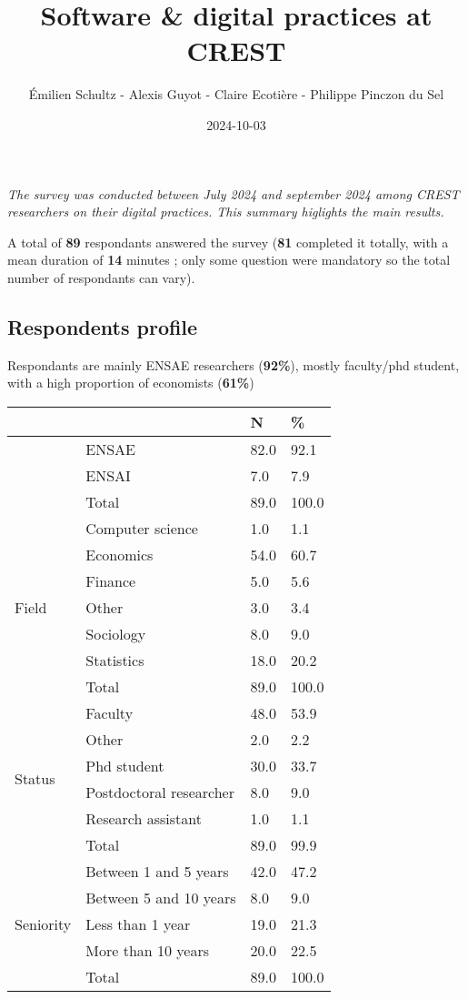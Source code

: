 \documentclass[
  letterpaper,
  DIV=11,
  numbers=noendperiod]{scrartcl}
\title{Software \& digital practices at CREST}
\author{Émilien Schultz - Alexis Guyot - Claire Ecotière - Philippe
Pinczon du Sel}
\date{2024-10-03}
\begin{document}
\maketitle


\emph{The survey was conducted between July 2024 and september 2024
among CREST researchers on their digital practices. This summary
higlights the main results.}

A total of \textbf{89} respondants answered the survey (\textbf{81}
completed it totally, with a mean duration of \textbf{14} minutes ; only
some question were mandatory so the total number of respondants can
vary).

\subsection{Respondents profile}\label{respondents-profile}

Respondants are mainly ENSAE researchers (\textbf{92\%}), mostly
faculty/phd student, with a high proportion of economists
(\textbf{61\%})

\begin{longtable}[]{@{}llll@{}}
\toprule\noalign{}
& & N & \% \\
\midrule\noalign{}
\endhead
\bottomrule\noalign{}
\endlastfoot
\multirow{3}{=}{Organization} & ENSAE & 82.0 & 92.1 \\
& ENSAI & 7.0 & 7.9 \\
& Total & 89.0 & 100.0 \\
\multirow{7}{=}{Field} & Computer science & 1.0 & 1.1 \\
& Economics & 54.0 & 60.7 \\
& Finance & 5.0 & 5.6 \\
& Other & 3.0 & 3.4 \\
& Sociology & 8.0 & 9.0 \\
& Statistics & 18.0 & 20.2 \\
& Total & 89.0 & 100.0 \\
\multirow{6}{=}{Status} & Faculty & 48.0 & 53.9 \\
& Other & 2.0 & 2.2 \\
& Phd student & 30.0 & 33.7 \\
& Postdoctoral researcher & 8.0 & 9.0 \\
& Research assistant & 1.0 & 1.1 \\
& Total & 89.0 & 99.9 \\
\multirow{5}{=}{Seniority} & Between 1 and 5 years & 42.0 & 47.2 \\
& Between 5 and 10 years & 8.0 & 9.0 \\
& Less than 1 year & 19.0 & 21.3 \\
& More than 10 years & 20.0 & 22.5 \\
& Total & 89.0 & 100.0 \\
\end{longtable}
\end{document}
